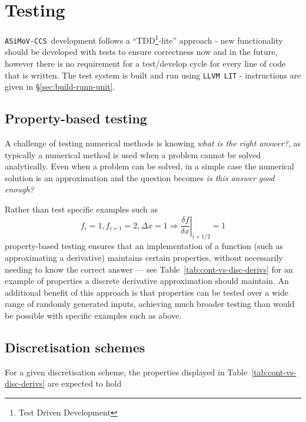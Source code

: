 \documentclass[11pt]{report}
\newcommand{\accs}{\texttt{ASiMoV-CCS}}
\begin{document}
\chapter{Testing}
\accs\ development follows a ``TDD\footnote{Test Driven Development}-lite'' approach - new functionality should be developed with
tests to ensure correctness now and in the future, however there is no requirement for a test/develop cycle for every line of code that is written.
The test system is built and run using \texttt{LLVM LIT} - instructions are given in \S\ref{sec:build-runn-unit}.


\section{Property-based testing}
\label{subsec:prop-based-test}

A challenge of testing numerical methods is knowing \textit{what is the right answer?}, as typically
a numerical method is used when a problem cannot be solved analytically.
Even when a problem can be solved, in a simple case the numerical solution is an approximation and
the question becomes \textit{is this answer good enough?}

Rather than test specific examples such as
\begin{equation}
  f_i=1, f_{i+1}=2, \Delta{}x=1 \Rightarrow \left. \frac{\delta f}{\delta x} \right|_{i+1/2} = 1
\end{equation}
property-based testing ensures that an implementation of a function (such as approximating a
derivative) maintains certain properties, without necessarily needing to know the correct answer ---
see Table~\ref{tab:cont-vs-disc-derivs} for an example of properties a discrete derivative
approximation should maintain.
An additional benefit of this approach is that properties can be tested over a wide range of
randomly generated inputs, achieving much broader testing than would be possible with specific
examples such as above.

\section{Discretisation schemes}

For a given discretisation scheme, the properties displayed in Table~\ref{tab:cont-vs-disc-derivs}
are expected to hold
\end{document}

